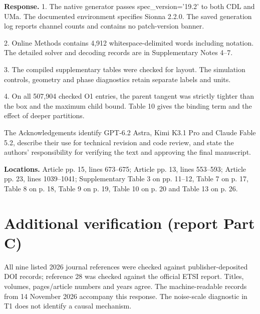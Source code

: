 \documentclass[10pt,letterpaper]{article}
\begin{document}
\textbf{Response.} 1. The native generator passes spec\_version='19.2' to both CDL and UMa. The documented environment specifies Sionna 2.2.0. The saved generation log reports channel counts and contains no patch-version banner.

2. Online Methods contains 4,912 whitespace-delimited words including notation. The detailed solver and decoding records are in Supplementary Notes 4–7.

3. The compiled supplementary tables were checked for layout. The simulation controls, geometry and phase diagnostics retain separate labels and units.

4. On all 507,904 checked O1 entries, the parent tangent was strictly tighter than the box and the maximum child bound. Table 10 gives the binding term and the effect of deeper partitions.

The Acknowledgements identify GPT-6.2 Astra, Kimi K3.1 Pro and Claude Fable 5.2, describe their use for technical revision and code review, and state the authors’ responsibility for verifying the text and approving the final manuscript.

\textbf{Locations.} Article pp. 15, lines 673–675; Article pp. 13, lines 553–593; Article pp. 23, lines 1039–1041; Supplementary Table 3 on pp. 11–12, Table 7 on p. 17, Table 8 on p. 18, Table 9 on p. 19, Table 10 on p. 20 and Table 13 on p. 26.

\section*{Additional verification (report Part C)}

All nine listed 2026 journal references were checked against publisher-deposited DOI records; reference 28 was checked against the official ETSI report. Titles, volumes, pages/article numbers and years agree. The machine-readable records from 14 November 2026 accompany this response. The noise-scale diagnostic in T1 does not identify a causal mechanism.
\end{document}
